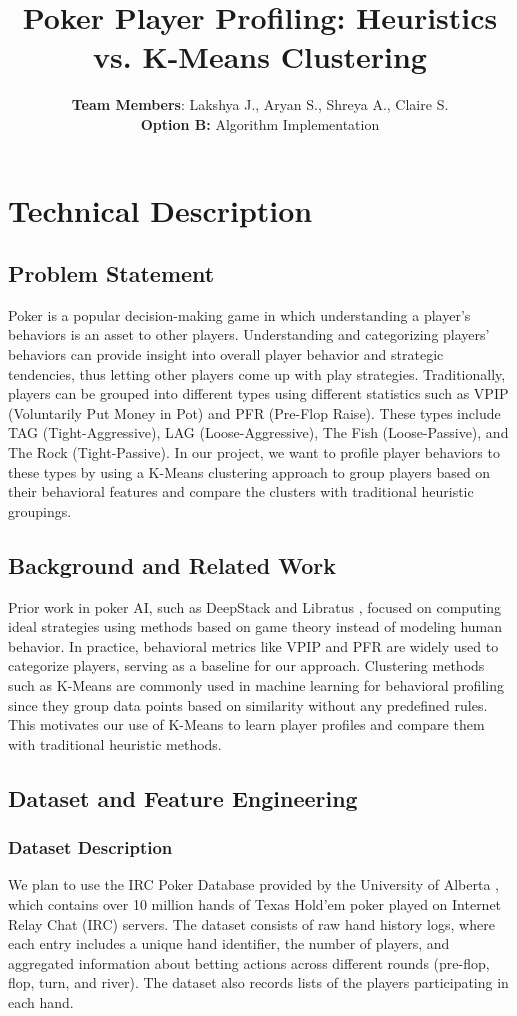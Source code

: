 \documentclass[11pt]{extarticle}
\title{Poker Player Profiling: Heuristics vs. K-Means Clustering }
\author{\textbf{Team Members}: Lakshya J., Aryan S., Shreya A., Claire S.
    \\ \textbf{Option B:} Algorithm Implementation}
\date{}
\begin{document}
\maketitle
\section{Technical Description}

\subsection{Problem Statement}
Poker is a popular decision-making game in which understanding a player's behaviors is an asset to other players. Understanding and categorizing players' behaviors can provide insight into overall player behavior and strategic tendencies, thus letting other players come up with play strategies. Traditionally, players can be grouped into different types using different statistics such as VPIP (Voluntarily Put Money in Pot) and PFR (Pre-Flop Raise). These types include TAG (Tight-Aggressive), LAG (Loose-Aggressive), The Fish (Loose-Passive), and The Rock (Tight-Passive). In our project, we want to profile player behaviors to these types by using a K-Means clustering approach to group players based on their behavioral features and compare the clusters with traditional heuristic groupings.

\subsection{Background and Related Work}
Prior work in poker AI, such as DeepStack \cite{moravcik2017deepstack} and Libratus \cite{brown2017libratus}, focused on computing ideal strategies using methods based on game theory instead of modeling human behavior. In practice, behavioral metrics like VPIP and PFR are widely used to categorize players, serving as a baseline for our approach. Clustering methods such as K-Means \cite{macqueen1967some} are commonly used in machine learning for behavioral profiling since they group data points based on similarity without any predefined rules. This motivates our use of K-Means to learn player profiles and compare them with traditional heuristic methods.

\subsection{Dataset and Feature Engineering}
\subsubsection{Dataset Description}
We plan to use the IRC Poker Database provided by the University of Alberta \cite{irc_poker_dataset}, which contains over 10 million hands of Texas Hold'em poker played on Internet Relay Chat (IRC) servers. The dataset consists of raw hand history logs, where each entry includes a unique hand identifier, the number of players, and aggregated information about betting actions across different rounds (pre-flop, flop, turn, and river). The dataset also records lists of the players participating in each hand.
\end{document}
